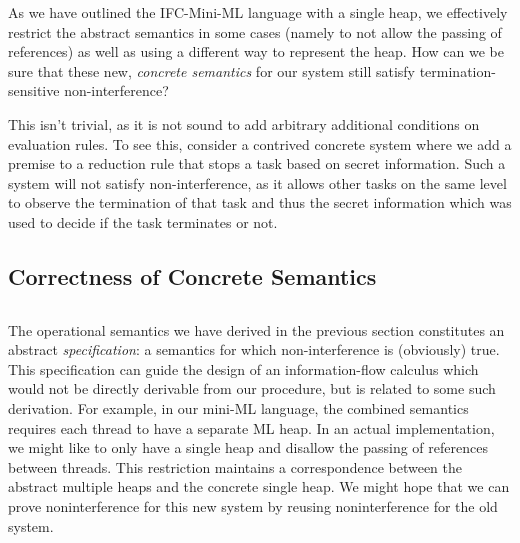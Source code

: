 
As we have outlined the IFC-Mini-ML language with a single heap, we
effectively restrict the abstract semantics in some cases (namely
to not allow the passing of references) as well as using a different
way to represent the heap.  How can we be sure that these
new, \textit{concrete semantics} for our system still satisfy
termination-sensitive non-interference?

This isn't trivial, as it is not sound to add arbitrary additional
conditions on evaluation rules.  To see this, consider a contrived
concrete system where we add a premise to a reduction rule that
stops a task based on secret information.  Such a system will
not satisfy non-interference, as it allows other tasks on the
same level to observe the termination of that task and thus the
secret information which was used to decide if the task terminates
or not.

\subsection{Correctness of Concrete Semantics}



\subsection{}

The operational semantics we have derived in the previous section
constitutes an abstract \emph{specification}: a semantics for which
non-interference is (obviously) true.  This specification can guide the
design of an information-flow calculus which would not be directly
derivable from our procedure, but is related to some such derivation.
For example, in our mini-ML language, the combined semantics requires
each thread to have a separate ML heap.  In an actual implementation, we
might like to only have a single heap and disallow the passing of
references between threads.  This restriction maintains a correspondence
between the abstract multiple heaps and the concrete single heap.  We might
hope that we can prove noninterference for this new system by reusing
noninterference for the old system.

